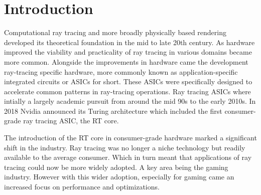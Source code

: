 \section{Introduction} \label{s:intro}






%     

Computational ray tracing and more broadly physically based rendering developed its theoretical foundation in the mid to late 20th century. As hardware improved the viability and practicality of ray tracing in various domains became more common. Alongside the improvements in hardware came the development ray-tracing specific hardware, more commonly known as application-specific integrated circuits or ASICs for short. These ASICs were specifically designed to accelerate common patterns in ray-tracing operations. Ray tracing ASICs where intially a largely academic pursuit from around the mid 90s to the early 2010s. In 2018 Nvidia announced its Turing architecture which included the first consumer-grade ray tracing ASIC, the RT core. 

The introduction of the RT core in consumer-grade hardware marked a significant shift in the industry. Ray tracing was no longer a niche technology but readily available to the average consumer. Which in turn meant that applications of ray tracing could now be more widely adopted. A key area being the gaming industry. However with this wider adoption, especially for gaming came an increased focus on performance and optimizations. 



